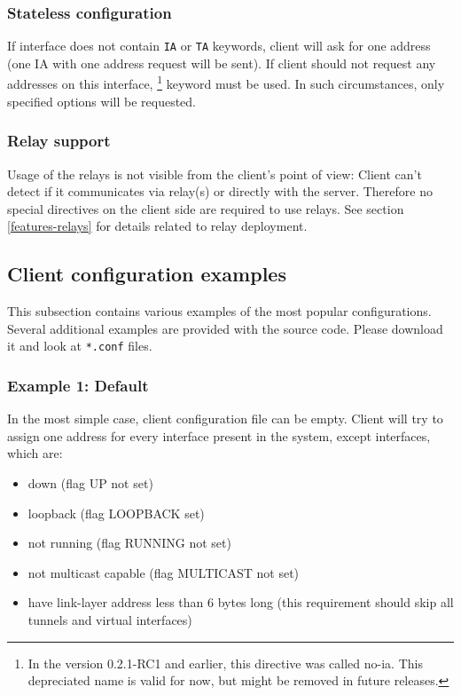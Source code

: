 \subsubsection{Stateless configuration}

If interface does not contain \verb+IA+ or \verb+TA+ keywords, client
will ask for one address (one IA with one address request will be sent).
If client should not request any addresses on this interface,
\footnote{In the version 0.2.1-RC1 and earlier, this
  directive was called no-ia. This depreciated name is valid for now,
  but might be removed in future releases.} keyword must be used. In
such circumstances, only specified options will be requested.

\subsubsection{Relay support}
Usage of the relays is not visible from the client's point of view:
Client can't detect if it communicates via relay(s) or directly
with the server. Therefore no special directives on the client side 
are required to use relays. See section \ref{features-relays} for
details related to relay deployment.

\subsection{Client configuration examples}
This subsection contains various examples of the most popular
configurations. Several additional examples are provided with the source
code. Please download it and look at \verb+*.conf+ files.

\subsubsection{Example 1: Default}
In the most simple case, client configuration file can be empty. Client will try to
assign one address for every interface present in the system, except
interfaces, which are:
\begin{itemize}
\item down (flag UP not set)
\item loopback (flag LOOPBACK set)
\item not running (flag RUNNING not set)
\item not multicast capable (flag MULTICAST not set)
\item have link-layer address less than 6 bytes long (this requirement
      should skip all tunnels and virtual interfaces)
\end{itemize}

